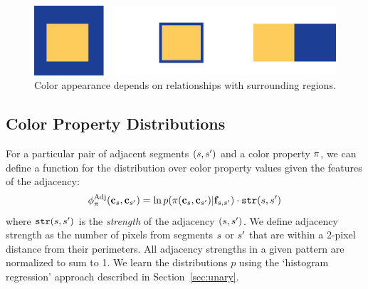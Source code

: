 \begin{figure}[ht]
\centering
\includegraphics[width=.7\columnwidth]{figs/surround}
\caption{Color appearance depends on relationships with surrounding regions.}
\label{fig:surround}
\end{figure}

\subsection{Color Property Distributions}
\label{sec:binaryDistribs}

For a particular pair of adjacent segments $(s, {s^{\prime}})$ and a color property $\pi$, we can define a function for the distribution over color property values given the features of the adjacency:
\begin{equation*}
\phi^{\textrm{Adj}}_\pi(\mathbf{c}_s, \mathbf{c}_{s^{\prime}}) = \ln p( \pi( \mathbf{c}_s, \mathbf{c}_{s^{\prime}} ) | \mathbf{f}_{s, {s^{\prime}}} ) \cdot \texttt{str}(s, {s^{\prime}})
\end{equation*}
where $\texttt{str}(s,{s^{\prime}})$ is the \emph{strength} of the adjacency $(s,{s^{\prime}})$. We define adjacency strength as the number of pixels from segments $s$ or ${s^{\prime}}$ that are within a 2-pixel distance from their perimeters. All adjacency strengths in a given pattern are normalized to sum to 1. We learn the distributions $p$ using the `histogram regression' approach described in Section~\ref{sec:unary}.


